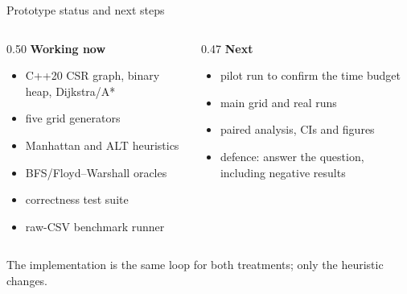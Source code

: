 \documentclass[aspectratio=169,10pt]{beamer}
\begin{document}
\begin{frame}{Prototype status and next steps}
  \begin{columns}[T,onlytextwidth]
    \begin{column}{0.50\textwidth}
      \textbf{Working now}
      \begin{itemize}
        \item C++20 CSR graph, binary heap, Dijkstra/A*
        \item five grid generators
        \item Manhattan and ALT heuristics
        \item BFS/Floyd--Warshall oracles
        \item correctness test suite
        \item raw-CSV benchmark runner
      \end{itemize}
    \end{column}
    \begin{column}{0.47\textwidth}
      \textbf{Next}
      \begin{itemize}
        \item pilot run to confirm the time budget
        \item main grid and real runs
        \item paired analysis, CIs and figures
        \item defence: answer the question, including negative results
      \end{itemize}
    \end{column}
  \end{columns}
  \vspace{0.7em}
  \centering
  \large The implementation is the same loop for both treatments; only the
  heuristic changes.
\end{frame}
\end{document}

